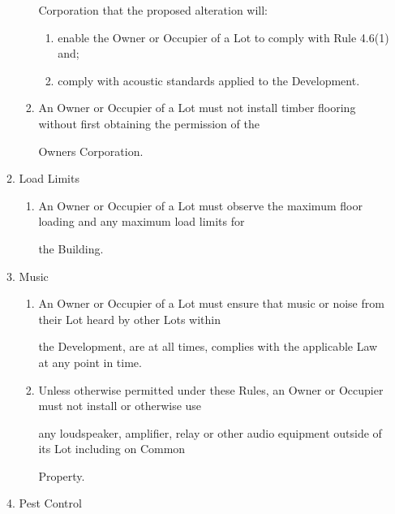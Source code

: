 \documentclass{article}
\begin{document}
\begin{enumerate}[label=\arabic*.]
\begin{enumerate}[label=\arabic{enumi}.\arabic*.]
\begin{enumerate}[label=(\arabic*)]
{\fontsize{10.02}{1}Corporation that the proposed alteration will: }

\begin{enumerate}[label=(\alph*)]
\item {\fontsize{9.962}{1} enable the Owner or Occupier of a Lot to comply with Rule 4.6(1) and; }

\item {\fontsize{9.962}{1} comply with acoustic standards applied to the Development. }

\end{enumerate}
\item {\fontsize{9.962}{1} An Owner or Occupier of a Lot must not install timber flooring without first obtaining the permission of the }

{\fontsize{10.02}{1}Owners Corporation. }

\end{enumerate}
\item {\fontsize{9.99}{1} Load Limits }

\begin{enumerate}[label=(\arabic*)]
\item {\fontsize{9.962}{1} An Owner or Occupier of a Lot must observe the maximum floor loading and any maximum load limits for }

{\fontsize{10.02}{1}the Building. }

\end{enumerate}
\item {\fontsize{9.99}{1} Music }

\begin{enumerate}[label=(\arabic*)]
\item {\fontsize{9.962}{1} An Owner or Occupier of a Lot must ensure that music or noise from their Lot heard by other Lots within }

{\fontsize{10.02}{1}the Development, are at all times, complies with the applicable Law at any point in time. }

\newpage

\item {\fontsize{9.962}{1} Unless otherwise permitted under these Rules, an Owner or Occupier must not install or otherwise use }

{\fontsize{10.02}{1}any loudspeaker, amplifier, relay or other audio equipment outside of its Lot including on Common }

{\fontsize{10.02}{1}Property. }

\end{enumerate}
\item {\fontsize{9.99}{1} Pest Control }


\end{enumerate}
\end{enumerate}
\end{document}
